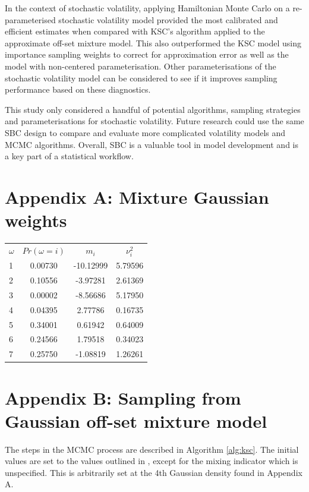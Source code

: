 \documentclass[12pt, a4paper]{article}
\begin{document}
In the context of stochastic volatility, applying Hamiltonian Monte Carlo on a re-parameterised stochastic volatility model provided the most calibrated and efficient estimates when compared with KSC's algorithm applied to the approximate off-set mixture model. This also outperformed the KSC model using importance sampling weights to correct for approximation error as well as the model with non-centered parameterisation. Other parameterisations of the stochastic volatility model can be considered to see if it improves sampling performance based on these diagnostics. 

This study only considered a handful of potential algorithms, sampling strategies and parameterisations for stochastic volatility. Future research could use the same SBC design to compare and evaluate more complicated volatility models and MCMC algorithms. Overall, SBC is a valuable tool in model development and is a key part of a statistical workflow. 
 
\newpage



\newpage

\section{Appendix A: Mixture Gaussian weights}

\begin{table}[H]
    \centering
    \begin{tabular}{lccc} 
          $\omega$ &$Pr(\omega = i)$&  $m_i$&  $\nu^2_i$\\ 
          1&0.00730  &  -10.12999&  5.79596\\ 
          2&0.10556  &   -3.97281 &  2.61369\\ 
          3&0.00002 &  -8.56686 &   5.17950\\ 
          4&0.04395 &  2.77786  &   0.16735 \\ 
          5&0.34001&   0.61942    &  0.64009\\ 
          6&0.24566 &  1.79518    &  0.34023 \\ 
          7&0.25750 &  -1.08819    &  1.26261\\ 
    \end{tabular} 
\end{table}

\newpage

\section{Appendix B: Sampling from Gaussian off-set mixture model}
    The steps in the MCMC process are described in Algorithm \ref{alg:ksc}. The initial values are set to the values outlined in \citet{kim1998stochastic}, except for the mixing indicator which is unspecified. This is arbitrarily set at the 4th Gaussian density found in Appendix A. 
        
\end{document}
